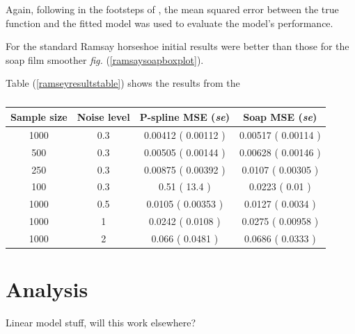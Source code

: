 \documentclass[a4paper,10pt]{amsart}
\newcommand{\fig}[1]{\emph{fig.} (\ref{#1})}
\begin{document}
Again, following in the footsteps of \cite{soap}, the mean squared error between the true function and the fitted model was used to evaluate the model's performance.

For the standard Ramsay horseshoe initial results were better than those for the soap film smoother \fig{ramsaysoapboxplot}.


Table (\ref{ramseyresultstable}) shows the results from the 


\begin{table}[ht]
\begin{tabular}{c c c c}\\
Sample size & Noise level & P-spline MSE (\emph{se}) & Soap MSE (\emph{se}) \\
\hline
\hline
1000 & 0.3 &  0.00412  ( 0.00112 ) &  0.00517  ( 0.00114 ) \\ 
500  & 0.3 &  0.00505  ( 0.00144 ) &  0.00628   ( 0.00146 ) \\ 
250  & 0.3 &  0.00875  ( 0.00392 ) &  0.0107   ( 0.00305 ) \\ 
100  & 0.3 &  0.51  ( 13.4 ) &  0.0223   ( 0.01 ) \\ 
1000 &  0.5  &  0.0105  ( 0.00353 ) &  0.0127  ( 0.0034 ) \\ 
1000 &  1  &  0.0242  ( 0.0108 ) &  0.0275  ( 0.00958 ) \\ 
1000 &  2  &  0.066  ( 0.0481 ) &  0.0686  ( 0.0333 ) \\ 
\end{tabular}
\label{}
\caption{}
\end{table}



\section{Analysis}


Linear model stuff, will this work elsewhere?















\end{document}

